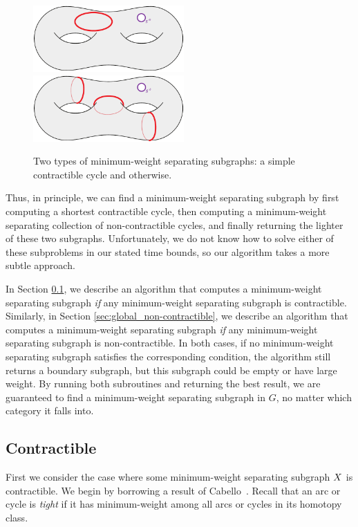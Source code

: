 \documentclass[letterpaper,review]{siamart190516}
\begin{document}
{\begin{figure}[ht]
\centering
\includegraphics[height=1in]{Fig/shortcon2}\qquad
\includegraphics[height=1in]{Fig/homologous4}
\caption{Two types of minimum-weight separating subgraphs: a simple contractible cycle and otherwise.}
\label{fig:global_cases}
\end{figure}

Thus, in principle, we can find a minimum-weight separating subgraph by first computing a shortest contractible cycle, then computing a minimum-weight separating collection of non-contractible cycles, and finally returning the lighter of these two subgraphs.  Unfortunately, we do not know how to solve either of these subproblems in our stated time bounds, so our algorithm takes a more subtle approach. 

In Section \ref{sec:global_contractible}, we describe an algorithm that computes a minimum-weight separating subgraph \emph{if} any minimum-weight separating subgraph is contractible.  Similarly, in Section \ref{sec:global_non-contractible}, we describe an algorithm that computes a minimum-weight separating subgraph \emph{if} any minimum-weight separating subgraph is non-contractible.  In both cases, if no minimum-weight separating subgraph satisfies the corresponding condition, the algorithm still returns a boundary subgraph, but this subgraph could be empty or have large weight.  By running both subroutines and returning the best result, we are guaranteed to find a minimum-weight separating subgraph in $G$, no matter which category it falls into.



\subsection{Contractible}
\label{sec:global_contractible}

First we consider the case where some minimum-weight separating subgraph $X$ is contractible.  
We begin by borrowing a result of Cabello~\cite[Lemma 4.1]{c-fscss-10}.  Recall that an arc or cycle is \emph{tight} if it has minimum-weight among all arcs or cycles in its homotopy class.

}
\end{document}
